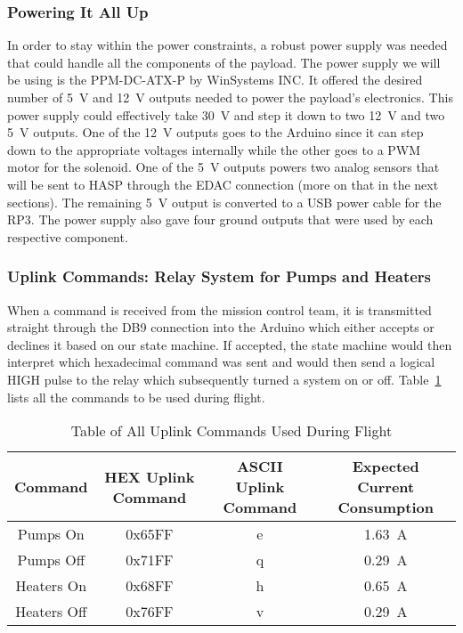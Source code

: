 \subsubsection{Powering It All Up}

In order to stay within the power constraints, a robust power supply was needed that could handle all the components of the payload.  The power supply we will be using is the PPM-DC-ATX-P by WinSystems INC.  It offered the desired number of \SI{+5}{\volt} and \SI{+12}{\volt} outputs needed to power the payload's electronics.  This power supply could effectively take \SI{+30}{\volt} and step it down to two \SI{+12}{\volt} and two \SI{+5 }{\volt} outputs.  One of the \SI{+12}{\volt} outputs goes to the Arduino since it can step down to the appropriate voltages internally while the other goes to a PWM motor for the solenoid.  One of the \SI{+5 }{\volt} outputs powers two analog sensors that will be sent to HASP through the EDAC connection (more on that in the next sections).  The remaining \SI{+5 }{\volt} output is converted to a USB power cable for the RP3.  The power supply also gave four ground outputs that were used by each respective component. 

\subsubsection{Uplink Commands: Relay System for Pumps and Heaters}

When a command is received from the mission control team, it is transmitted straight through the DB9 connection into the Arduino which either accepts or declines it based on our state machine.  If accepted, the state machine would then interpret which hexadecimal command was sent and would then send a logical HIGH pulse to the relay which subsequently turned a system on or off.  Table~\ref{tab:All-Commands} lists all the commands to be used during flight.

\begin{table}[!ht]
\centering
\caption{Table of All Uplink Commands Used During Flight} 
\label{tab:All-Commands}
\bigskip
\begin{tabular}{|c|c|c|c|}
\hline
\multicolumn{1}{|c|}{\bfseries Command} & \multicolumn{1}{c|}{\bfseries HEX Uplink Command} &  \multicolumn{1}{c|}{\bfseries ASCII Uplink Command} & \multicolumn{1}{c|}{\bfseries Expected Current Consumption} \\
\hline
    Pumps On     	& 0x65FF 	& e	 & \SI{1.63}{\ampere}   \\ \hline %
    Pumps Off    	& 0x71FF 	& q	 & \SI{0.29}{\ampere}    \\ \hline
    Heaters On  	& 0x68FF 	& h	 & \SI{0.65}{\ampere}    \\ \hline %
    Heaters Off 	& 0x76FF 	& v	 & \SI{0.29}{\ampere}    \\ \hline
\end{tabular}
\medskip
\end{table}


